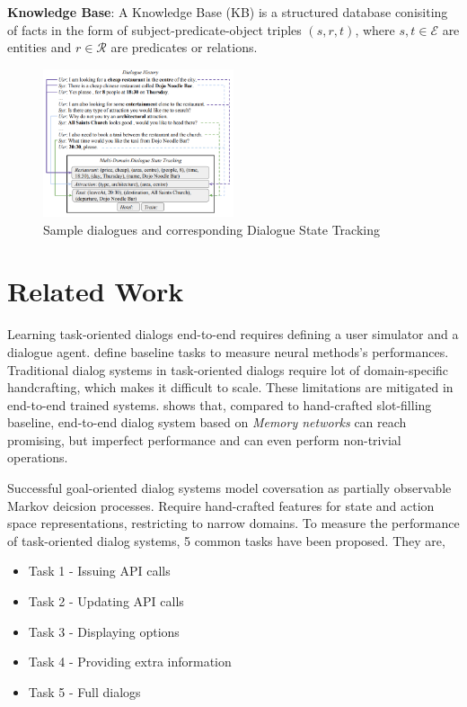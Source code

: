 \documentclass[12pt,a4paper]{article}
\begin{document}
\medskip \noindent \textbf{Knowledge Base}: A Knowledge Base (KB) is a structured database conisiting of facts in the form of subject-predicate-object triples $(s, r, t)$, where $s, t \in \mathcal{E}$ are entities and $r \in \mathcal{R}$ are predicates or relations.

\begin{figure}[!ht]
  \centering
  \includegraphics[width=0.5\textwidth]{./images/dst.png}
  \caption{Sample dialogues and corresponding Dialogue State Tracking}
\end{figure}

\section{Related Work}

Learning task-oriented dialogs end-to-end requires defining a user simulator and a dialogue agent. \citeauthor{Bordes2016LearningEG} define baseline tasks to measure neural methods's performances. Traditional dialog systems in task-oriented dialogs require lot of domain-specific handcrafting, which makes it difficult to scale. These limitations are mitigated in end-to-end trained systems. \cite{Bordes2016LearningEG} shows that, compared to hand-crafted slot-filling baseline, end-to-end dialog system based on \textit{Memory networks} \cite{Sukhbaatar2015EndToEndMN} can reach promising, but imperfect performance and can even perform non-trivial operations.

Successful goal-oriented dialog systems model coversation as partially observable Markov deicsion processes. Require hand-crafted features for state and action space representations, restricting to narrow domains. To measure the performance of task-oriented dialog systems, 5 common tasks have been proposed. They are,

\begin{itemize}[leftmargin=*,label={}]
  \setlength\itemsep{0em}
  \item Task 1 - Issuing API calls
  \item Task 2 - Updating API calls
  \item Task 3 - Displaying options
  \item Task 4 - Providing extra information
  \item Task 5 - Full dialogs
\end{itemize}
\end{document}
